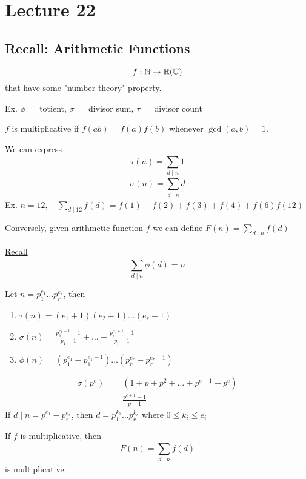 \chapter{Lecture 22}
\date{November 14, 2024}

\section{Recall: Arithmetic Functions}
    \[
        f: \mathbb{N} \rightarrow \mathbb{R} (\mathbb{C})
    \]
    that have some "number theory" property. 

    Ex. $\phi = $ totient, $\sigma = $ divisor sum, $\tau = $ divisor count 

    \begin{definition}
        $f$ is multiplicative if $f(ab) = f(a)f(b)$ whenever $\gcd(a,b) = 1$.
    \end{definition}

    We can express 
    \[
        \tau(n) = \sum_{d\mid n}^{} 1
    \]
    \[
        \sigma(n) = \sum_{d\mid n}^{} d
    \]
    Ex. $n=12, \quad\sum_{d\mid 12}^{} f(d) = f(1)+f(2)+f(3)+f(4)+f(6)f(12)$

    Conversely, given arithmetic function $f$ we can define $F(n) = \sum_{d\mid n}^{} f(d)$

    \underline{Recall}
    \[
        \sum_{d\mid n}^{} \phi(d) = n
    \]

    \begin{theorem}
        Let $n = p_1^{e_1}\dots p_r^{e_r}$, then 
        \begin{enumerate}
            \item $\tau(n) = (e_1 + 1)(e_2 + 1)\dots(e_r + 1)$
            \item $\sigma(n) = \frac{p_1^{e_1+1} - 1}{p_1 - 1} + \dots + \frac{p_r^{e_r+1} - 1}{p_r - 1}$
            \item $\phi(n) = (p_1^{e_1} - p_1^{e_1-1})\dots(p_r^{e_r} - p_r^{e_r - 1})$
        \end{enumerate}
        \begin{align*}
            \sigma(p^e) &= (1+p+p^2+\dots+p^{e-1}+p^e) \\
            &= \frac{p^{e+1}-1}{p-1}
        \end{align*}
        If $d\mid n = p_1^{e_1} - p_r^{e_r}$, then $d=p_1^{k_1}\dots p_r^{k_r}$ where $0\le k_i \le e_i$
    \end{theorem}

    \begin{theorem}
        If $f$ is multiplicative, then 
        \[
            F(n) = \sum_{d\mid n}^{} f(d)
        \]
        is multiplicative. 
    \end{theorem}


